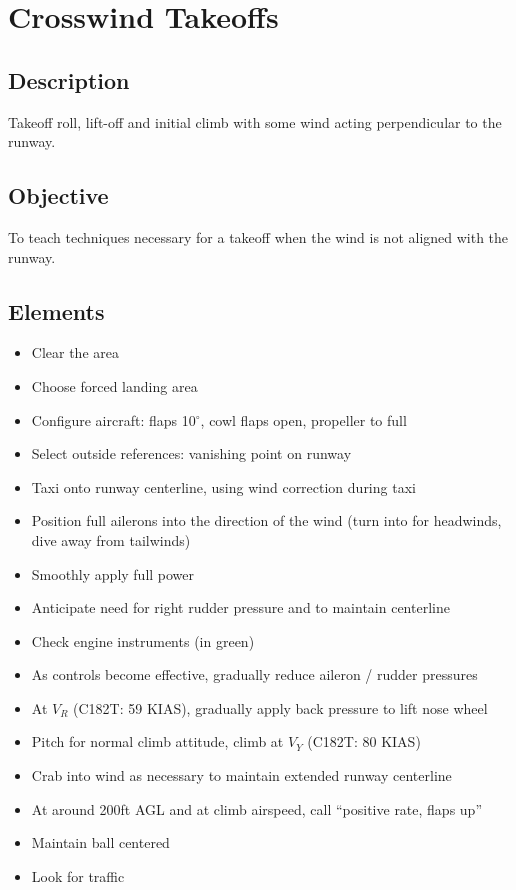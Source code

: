 \section{Crosswind Takeoffs}

\subsection{Description}

Takeoff roll, lift-off and initial climb with some wind acting perpendicular to
the runway.

\subsection{Objective}

To teach techniques necessary for a takeoff when the wind is not aligned with
the runway.

\subsection{Elements}

\begin{itemize}
  \item Clear the area
  \item Choose forced landing area
  \item Configure aircraft: flaps 10$^\circ$, cowl flaps open, propeller to
    full
  \item Select outside references: vanishing point on runway
  \item Taxi onto runway centerline, using wind correction during taxi
  \item Position full ailerons into the direction of the wind (turn into for
    headwinds, dive away from tailwinds)
  \item Smoothly apply full power
  \item Anticipate need for right rudder pressure and to maintain centerline
  \item Check engine instruments (in green)
  \item As controls become effective, gradually reduce aileron / rudder
    pressures
  \item At $V_R$ (C182T: 59 KIAS), gradually apply back pressure to lift nose
    wheel
  \item Pitch for normal climb attitude, climb at $V_Y$ (C182T: 80 KIAS)
  \item Crab into wind as necessary to maintain extended runway centerline
  \item At around 200ft AGL and at climb airspeed, call ``positive rate, flaps
    up''
  \item Maintain ball centered 
  \item Look for traffic
\end{itemize}

